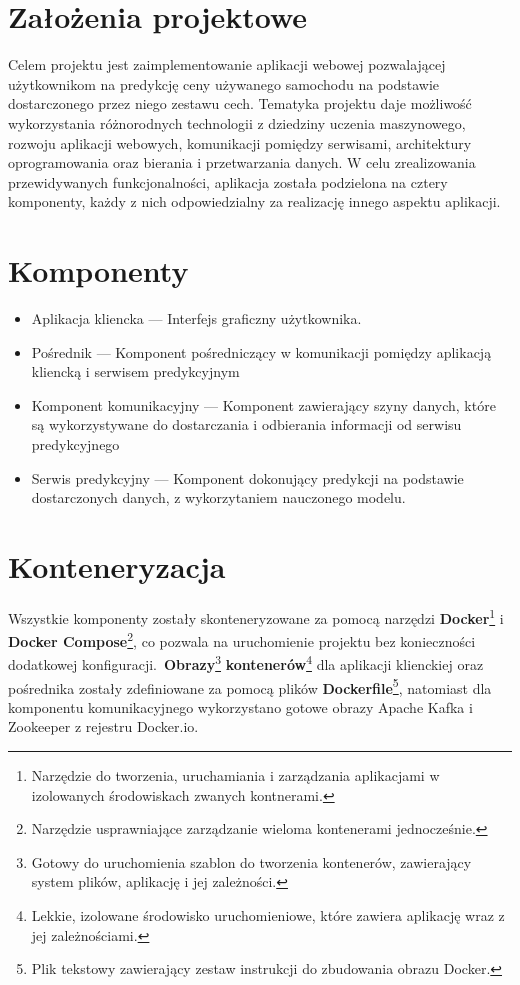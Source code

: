 \documentclass[12pt, a4paper]{report}
\begin{document}
\section{Założenia projektowe}
Celem projektu jest zaimplementowanie aplikacji webowej pozwalającej użytkownikom na predykcję 
ceny używanego samochodu na podstawie dostarczonego przez niego zestawu cech. Tematyka projektu
daje możliwość wykorzystania różnorodnych technologii z dziedziny uczenia maszynowego, rozwoju
aplikacji webowych, komunikacji pomiędzy serwisami, architektury oprogramowania oraz bierania i 
przetwarzania danych. W celu zrealizowania przewidywanych funkcjonalności, aplikacja została
podzielona na cztery komponenty, każdy z nich odpowiedzialny za realizację innego aspektu
aplikacji.
\section{Komponenty}
\begin{itemize}
    \item Aplikacja kliencka --- Interfejs graficzny użytkownika.
    \item Pośrednik --- Komponent pośredniczący w komunikacji pomiędzy aplikacją kliencką i serwisem predykcyjnym
    \item Komponent komunikacyjny --- Komponent zawierający szyny danych, które są wykorzystywane do dostarczania i odbierania informacji od serwisu predykcyjnego
    \item Serwis predykcyjny --- Komponent dokonujący predykcji na podstawie dostarczonych danych, z wykorzytaniem nauczonego modelu.
\end{itemize}
\section{Konteneryzacja}
Wszystkie komponenty zostały skonteneryzowane za pomocą narzędzi
\textbf{Docker}\footnote{Narzędzie do tworzenia, uruchamiania i zarządzania aplikacjami w izolowanych środowiskach zwanych kontnerami.}
i \textbf{Docker Compose}\footnote{Narzędzie usprawniające zarządzanie wieloma kontenerami jednocześnie.}, co pozwala na uruchomienie projektu
bez konieczności dodatkowej konfiguracji.\ \textbf{Obrazy}\footnote{Gotowy do uruchomienia szablon do tworzenia kontenerów, zawierający system plików, aplikację i jej zależności.}
 \textbf{kontenerów}\footnote{Lekkie, izolowane środowisko uruchomieniowe, które zawiera aplikację wraz z jej zależnościami. }
dla aplikacji klienckiej oraz pośrednika zostały zdefiniowane za pomocą
plików \textbf{Dockerfile}\footnote{Plik tekstowy zawierający zestaw instrukcji do zbudowania obrazu Docker.},
natomiast dla komponentu komunikacyjnego wykorzystano gotowe obrazy Apache Kafka i Zookeeper z rejestru Docker.io.\\[0cm]
\end{document}
